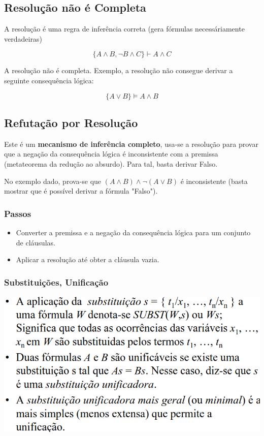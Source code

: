 \documentclass{article}
\begin{document}
\subsection{Resolução não é Completa}

A resolução é uma regra de inferência correta
(gera fórmulas necessáriamente verdadeiras)

\[ \{ A \wedge B, \neg B \wedge C \} \vdash A \wedge C \]

A resolução não é completa. Exemplo, a resolução não consegue derivar a
seguinte consequência lógica:

\[ \{ A \vee B \} \vDash A \wedge B \]

\subsection{Refutação por Resolução}

Este é um \textbf{mecanismo de inferência completo}, usa-se a resolução para provar que a negação da
consequência lógica é inconsistente com a premissa (metateorema da redução ao absurdo). Para tal,
basta derivar Falso.

No exemplo dado, prova-se que $(A \wedge B) \wedge \neg (A \vee B)$ é inconsistente
(basta mostrar que é possível derivar a fórmula "Falso").

\subsubsection{Passos}

\begin{itemize}
  \item Converter a premissa e a negação da consequência lógica
  para um conjunto de cláusulas.
  \item Aplicar a resolução até obter a cláusula vazia.
\end{itemize}

\pagebreak

\subsubsection{Substituições, Unificação}

\begin{center}
  \includegraphics[scale=0.3]{38}
\end{center}
\end{document}
